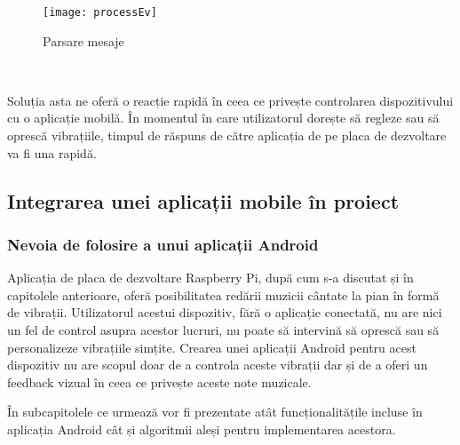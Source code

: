 \documentclass[../IoMusT.tex]{subfiles}
\begin{document}
\begin{figure}[h]
\centering
\texttt{[image: processEv]}
\caption{Parsare mesaje}
\label{fig:processEv}
\end{figure} 
\\
\par Soluția asta ne oferă o reacție rapidă în ceea ce privește controlarea dispozitivului cu o aplicație mobilă. În momentul în care utilizatorul dorește să regleze sau să oprescă vibrațiile, timpul de răspuns de către aplicația de pe placa de dezvoltare va fi una rapidă. 
\subsection{Integrarea unei aplicații mobile în proiect}
\subsubsection{Nevoia de folosire a unui aplicații Android}
Aplicația de placa de dezvoltare Raspberry Pi, după cum s-a discutat și în capitolele anterioare, oferă posibilitatea redării muzicii cântate la pian în formă de vibrații. Utilizatorul acestui dispozitiv, fără o aplicație conectată, nu are nici un fel de control asupra acestor lucruri, nu poate să intervină să oprescă sau să personalizeze vibrațiile simțite. Crearea unei aplicații Android pentru acest dispozitiv nu are scopul doar de a controla aceste vibrații dar și de a oferi un feedback vizual în ceea ce privește aceste note muzicale. 
\\
\par În subcapitolele ce urmează vor fi prezentate atât funcționalitățile incluse în aplicația Android cât și algoritmii aleși pentru implementarea acestora.
\end{document}
